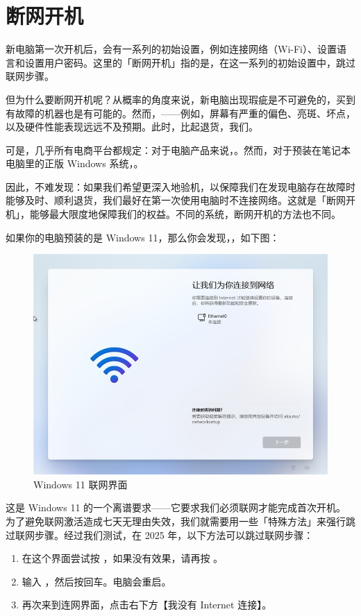 \section{断网开机}

新电脑第一次开机后，会有一系列的初始设置，例如连接网络（Wi-Fi）、设置语言和设置用户密码。这里的「断网开机」指的是，在这一系列的初始设置中，跳过联网步骤。

但为什么要断网开机呢？从概率的角度来说，新电脑出现瑕疵是不可避免的，买到有故障的机器也是有可能的。然而，——例如，屏幕有严重的偏色、亮斑、坏点，以及硬件性能表现远远不及预期。此时，比起退货，我们。

可是，几乎所有电商平台都规定：对于电脑产品来说，。然而，对于预装在笔记本电脑里的正版 Windows 系统，。

因此，不难发现：如果我们希望更深入地验机，以保障我们在发现电脑存在故障时能够及时、顺利退货，我们最好在第一次使用电脑时不连接网络。这就是「断网开机」，能够最大限度地保障我们的权益。不同的系统，断网开机的方法也不同。

如果你的电脑预装的是 Windows 11，那么你会发现，，如下图：

\begin{figure}[htb!]
  \centering
  \includegraphics[width=.5\textwidth]{assets/appendix/Windows_11_no_skip_internet.png}
  \caption{Windows 11 联网界面}
  \label{fig:Windows_11_no_skip_internet}
\end{figure}

这是 Windows 11 的一个离谱要求——它要求我们必须联网才能完成首次开机。为了避免联网激活造成七天无理由失效，我们就需要用一些「特殊方法」来强行跳过联网步骤。经过我们测试，在 2025 年，以下方法可以跳过联网步骤：

\begin{enumerate}
  \item 在这个界面尝试按 ，如果没有效果，请再按 。
  \item 输入 ，然后按回车。电脑会重启。
  \item 再次来到连网界面，点击右下方【我没有 Internet 连接】。
\end{enumerate}

